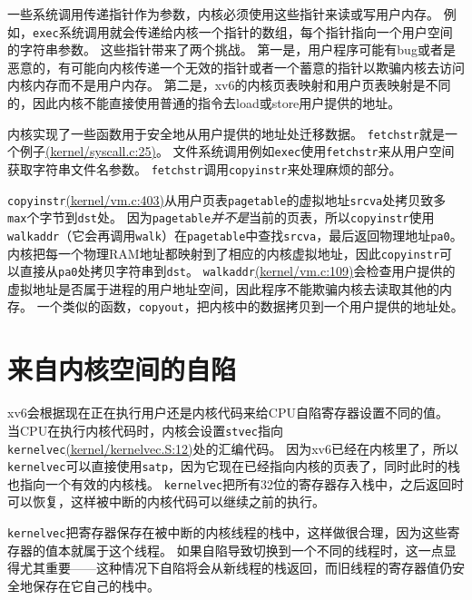 一些系统调用传递指针作为参数，内核必须使用这些指针来读或写用户内存。
例如，\texttt{exec}系统调用就会传递给内核一个指针的数组，每个指针指向一个用户空间的字符串参数。
这些指针带来了两个挑战。
第一是，用户程序可能有bug或者是恶意的，有可能向内核传递一个无效的指针或者一个蓄意的指针以欺骗内核去访问内核内存而不是用户内存。
第二是，xv6的内核页表映射和用户页表映射是不同的，因此内核不能直接使用普通的指令去load或store用户提供的地址。

内核实现了一些函数用于安全地从用户提供的地址处迁移数据。
\texttt{fetchstr}就是一个例子\href{https://github.com/mit-pdos/xv6-riscv/blob/risc/kernel/syscall.c#L25}{(kernel/syscall.c:25)}。
文件系统调用例如\texttt{exec}使用\texttt{fetchstr}来从用户空间获取字符串文件名参数。
\texttt{fetchstr}调用\texttt{copyinstr}来处理麻烦的部分。

\texttt{copyinstr}\href{https://github.com/mit-pdos/xv6-riscv/blob/risc/kernel/vm.c#L403}{(kernel/vm.c:403)}从用户页表\texttt{pagetable}的虚拟地址\texttt{srcva}处拷贝致多\texttt{max}个字节到\texttt{dst}处。
因为\texttt{pagetable}\emph{并不是}当前的页表，所以\texttt{copyinstr}使用\texttt{walkaddr}（它会再调用\texttt{walk}）在\texttt{pagetable}中查找\texttt{srcva}，最后返回物理地址\texttt{pa0}。
内核把每一个物理RAM地址都映射到了相应的内核虚拟地址，因此\texttt{copyinstr}可以直接从\texttt{pa0}处拷贝字符串到\texttt{dst}。
\texttt{walkaddr}\href{https://github.com/mit-pdos/xv6-riscv/blob/risc/kernel/vm.c#L109}{(kernel/vm.c:109)}会检查用户提供的虚拟地址是否属于进程的用户地址空间，因此程序不能欺骗内核去读取其他的内存。
一个类似的函数，\texttt{copyout}，把内核中的数据拷贝到一个用户提供的地址处。

\section{来自内核空间的自陷}\label{s4-5}
xv6会根据现在正在执行用户还是内核代码来给CPU自陷寄存器设置不同的值。
当CPU在执行内核代码时，内核会设置\texttt{stvec}指向\texttt{kernelvec}\href{https://github.com/mit-pdos/xv6-riscv/blob/risc/kernel/kernelvec.S#L12}{(kernel/kernelvec.S:12)}处的汇编代码。
因为xv6已经在内核里了，所以\texttt{kernelvec}可以直接使用\texttt{satp}，因为它现在已经指向内核的页表了，同时此时的栈也指向一个有效的内核栈。
\texttt{kernelvec}把所有32位的寄存器存入栈中，之后返回时可以恢复，这样被中断的内核代码可以继续之前的执行。

\texttt{kernelvec}把寄存器保存在被中断的内核线程的栈中，这样做很合理，因为这些寄存器的值本就属于这个线程。
如果自陷导致切换到一个不同的线程时，这一点显得尤其重要——这种情况下自陷将会从新线程的栈返回，而旧线程的寄存器值仍安全地保存在它自己的栈中。

